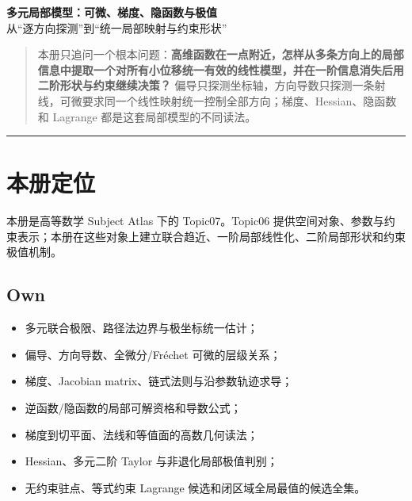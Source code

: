 \documentclass[11pt,a4paper,fontset=fandol]{ctexart}
\begin{document}
\begin{center}
{\LARGE\textbf{多元局部模型：可微、梯度、隐函数与极值}}\\[0.4em]
{\large 从“逐方向探测”到“统一局部映射与约束形状”}
\end{center}
\vspace{0.5em}

\begin{quote}
本册只追问一个根本问题：\textbf{高维函数在一点附近，怎样从多条方向上的局部信息中提取一个对所有小位移统一有效的线性模型，并在一阶信息消失后用二阶形状与约束继续决策？} 偏导只探测坐标轴，方向导数只探测一条射线，可微要求同一个线性映射统一控制全部方向；梯度、Hessian、隐函数和 Lagrange 都是这套局部模型的不同读法。
\end{quote}

\begin{center}\rule{0.5\linewidth}{0.5pt}\end{center}

\setcounter{section}{-1}
\section{本册定位}

本册是高等数学 Subject Atlas 下的 Topic07。Topic06 提供空间对象、参数与约束表示；本册在这些对象上建立联合趋近、一阶局部线性化、二阶局部形状和约束极值机制。

\subsection{Own}
\begin{itemize}
  \item 多元联合极限、路径法边界与极坐标统一估计；
  \item 偏导、方向导数、全微分/Fréchet 可微的层级关系；
  \item 梯度、Jacobian matrix、链式法则与沿参数轨迹求导；
  \item 逆函数/隐函数的局部可解资格和导数公式；
  \item 梯度到切平面、法线和等值面的高数几何读法；
  \item Hessian、多元二阶 Taylor 与非退化局部极值判别；
  \item 无约束驻点、等式约束 Lagrange 候选和闭区域全局最值的候选全集。
\end{itemize}
\end{document}
